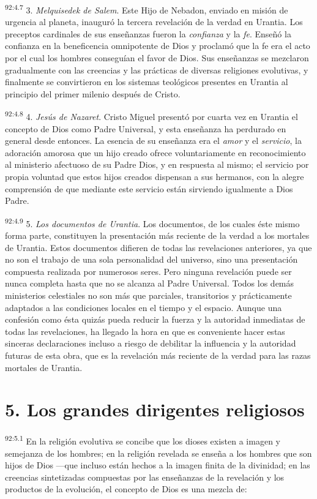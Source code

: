 \par
\textsuperscript{92:4.7} 3. \textit{Melquisedek de Salem}. Este Hijo de Nebadon, enviado en misión de urgencia al planeta, inauguró la tercera revelación de la verdad en Urantia. Los preceptos cardinales de sus enseñanzas fueron la \textit{confianza} y la \textit{fe}. Enseñó la confianza en la beneficencia omnipotente de Dios y proclamó que la fe era el acto por el cual los hombres conseguían el favor de Dios. Sus enseñanzas se mezclaron gradualmente con las creencias y las prácticas de diversas religiones evolutivas, y finalmente se convirtieron en los sistemas teológicos presentes en Urantia al principio del primer milenio después de Cristo.

\par
\textsuperscript{92:4.8} 4. \textit{Jesús de Nazaret}. Cristo Miguel presentó por cuarta vez en Urantia el concepto de Dios como Padre Universal, y esta enseñanza ha perdurado en general desde entonces. La esencia de su enseñanza era el \textit{amor} y el \textit{servicio}, la adoración amorosa que un hijo creado ofrece voluntariamente en reconocimiento al ministerio afectuoso de su Padre Dios, y en respuesta al mismo; el servicio por propia voluntad que estos hijos creados dispensan a sus hermanos, con la alegre comprensión de que mediante este servicio están sirviendo igualmente a Dios Padre.

\par
\textsuperscript{92:4.9} 5. \textit{Los documentos de Urantia}. Los documentos, de los cuales éste mismo forma parte, constituyen la presentación más reciente de la verdad a los mortales de Urantia. Estos documentos difieren de todas las revelaciones anteriores, ya que no son el trabajo de una sola personalidad del universo, sino una presentación compuesta realizada por numerosos seres. Pero ninguna revelación puede ser nunca completa hasta que no se alcanza al Padre Universal. Todos los demás ministerios celestiales no son más que parciales, transitorios y prácticamente adaptados a las condiciones locales en el tiempo y el espacio. Aunque una confesión como ésta quizás pueda reducir la fuerza y la autoridad inmediatas de todas las revelaciones, ha llegado la hora en que es conveniente hacer estas sinceras declaraciones incluso a riesgo de debilitar la influencia y la autoridad futuras de esta obra, que es la revelación más reciente de la verdad para las razas mortales de Urantia.

\section*{5. Los grandes dirigentes religiosos}
\par
\textsuperscript{92:5.1} En la religión evolutiva se concibe que los dioses existen a imagen y semejanza de los hombres; en la religión revelada se enseña a los hombres que son hijos de Dios ---que incluso están hechos a la imagen finita de la divinidad; en las creencias sintetizadas compuestas por las enseñanzas de la revelación y los productos de la evolución, el concepto de Dios es una mezcla de:

